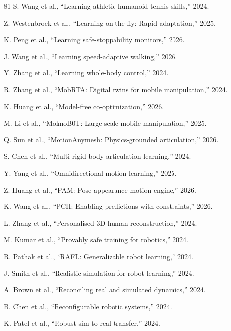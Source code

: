 \documentclass[journal]{IEEEtran}
\begin{document}
\begin{thebibliography}{81}
 S. Wang et al., ``Learning athletic humanoid tennis skills,'' 2024.

 Z. Westenbroek et al., ``Learning on the fly: Rapid adaptation,'' 2025.

 K. Peng et al., ``Learning safe-stoppability monitors,'' 2026.

 J. Wang et al., ``Learning speed-adaptive walking,'' 2026.

 Y. Zhang et al., ``Learning whole-body control,'' 2024.

 R. Zhang et al., ``MobRTA: Digital twins for mobile manipulation,'' 2024.

 K. Huang et al., ``Model-free co-optimization,'' 2026.

 M. Li et al., ``MolmoB0T: Large-scale mobile manipulation,'' 2025.

 Q. Sun et al., ``MotionAnymesh: Physics-grounded articulation,'' 2026.

 S. Chen et al., ``Multi-rigid-body articulation learning,'' 2024.

 Y. Yang et al., ``Omnidirectional motion learning,'' 2025.

 Z. Huang et al., ``PAM: Pose-appearance-motion engine,'' 2026.

 K. Wang et al., ``PCH: Enabling predictions with constraints,'' 2026.

 L. Zhang et al., ``Personalised 3D human reconstruction,'' 2024.

 M. Kumar et al., ``Provably safe training for robotics,'' 2024.

 R. Pathak et al., ``RAFL: Generalizable robot learning,'' 2024.

 J. Smith et al., ``Realistic simulation for robot learning,'' 2024.

 A. Brown et al., ``Reconciling real and simulated dynamics,'' 2024.

 B. Chen et al., ``Reconfigurable robotic systems,'' 2024.

 K. Patel et al., ``Robust sim-to-real transfer,'' 2024.


\end{thebibliography}
\end{document}
